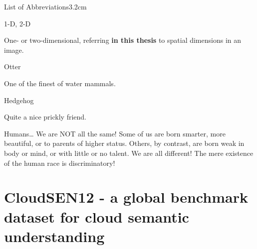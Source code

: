 \documentclass[a4paper, nobind]{templates/cdethesis}
\begin{document}
\begin{romanpages}
\listoffigures
	\mtcaddchapter

\listoftables
  \mtcaddchapter
\begin{mclistof}{List of Abbreviations}{3.2cm}

\item[1-D, 2-D]

One- or two-dimensional, referring \textbf{in this thesis} to spatial dimensions in an image.

\item[Otter]

One of the finest of water mammals.

\item[Hedgehog]

Quite a nice prickly friend.

\end{mclistof} 


\end{romanpages}

\flushbottom

\begin{savequote}
Humans\ldots{} We are NOT all the same! Some of us are born smarter,
more beautiful, or to parents of higher status. Others, by contrast, are
born weak in body or mind, or with little or no talent. We are all
different! The mere existence of the human race is discriminatory!
\end{savequote}



\hypertarget{cloudsen12---a-global-benchmark-dataset-for-cloud-semantic-understanding}{%
\chapter{CloudSEN12 - a global benchmark dataset for cloud semantic understanding}\label{cloudsen12---a-global-benchmark-dataset-for-cloud-semantic-understanding}}
\end{document}
